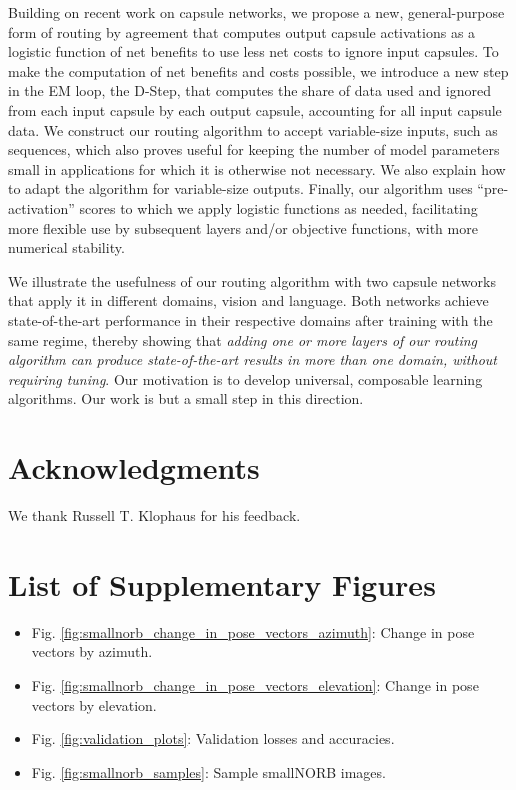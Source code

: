\documentclass[11pt,a4paper]{article}
\begin{document}
Building on recent work on capsule networks, we propose a new, general-purpose form of routing by agreement that computes output capsule activations as a logistic function of net benefits to use less net costs to ignore input capsules. To make the computation of net benefits and costs possible, we introduce a new step in the EM loop, the D-Step, that computes the share of data used and ignored from each input capsule by each output capsule, accounting for all input capsule data. We construct our routing algorithm to accept variable-size inputs, such as sequences, which also proves useful for keeping the number of model parameters small in applications for which it is otherwise not necessary. We also explain how to adapt the algorithm for variable-size outputs. Finally, our algorithm uses ``pre-activation'' scores to which we apply logistic functions as needed, facilitating more flexible use by subsequent layers and/or objective functions, with more numerical stability.

We illustrate the usefulness of our routing algorithm with two capsule networks that apply it in different domains, vision and language. Both networks achieve state-of-the-art performance in their respective domains after training with the same regime, thereby showing that {\em adding one or more layers of our routing algorithm can produce state-of-the-art results in more than one domain, without requiring tuning}. Our motivation is to develop universal, composable learning algorithms. Our work is but a small step in this direction.

\section*{Acknowledgments}

We thank Russell T. Klophaus for his feedback.






\appendix

\section*{List of Supplementary Figures}

\begin{itemize}
	\item Fig. \ref{fig:smallnorb_change_in_pose_vectors_azimuth}: Change in pose vectors by azimuth.
	\item Fig. \ref{fig:smallnorb_change_in_pose_vectors_elevation}: Change in pose vectors by elevation.
	\item Fig. \ref{fig:validation_plots}: Validation losses and accuracies.
	\item Fig. \ref{fig:smallnorb_samples}: Sample smallNORB images.
\end{itemize}
\end{document}
